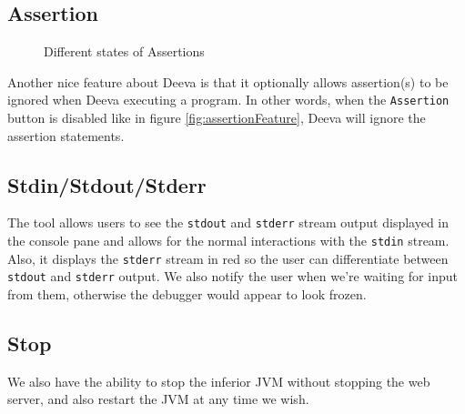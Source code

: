 \documentclass[11pt, a4paper]{article}
\newcommand{\cmd}[1]{{\tt #1}}
\begin{document}
\subsection{Assertion}
\begin{figure}[h!]
\centering
{}
\quad
{}
\caption{Different states of Assertions}
\end{figure}
Another nice feature about Deeva is that it optionally allows assertion(s) to be ignored when Deeva executing a program.
In other words, when the {\tt Assertion} button is disabled like in figure \ref{fig:assertionFeature}, Deeva will ignore the assertion statements.

\subsection{Stdin/Stdout/Stderr}
The tool allows users to see the \cmd{stdout} and \cmd{stderr} stream output displayed in the console pane and allows for the normal interactions with the \cmd{stdin} stream. Also, it displays the \cmd{stderr} stream in red so the user can differentiate between \cmd{stdout} and \cmd{stderr} output.
We also notify the user when we're waiting for input from them, otherwise the debugger would appear to look frozen.

\subsection{Stop}
We also have the ability to stop the inferior JVM without stopping the web server, and also restart the JVM at any time we wish.
\end{document}
